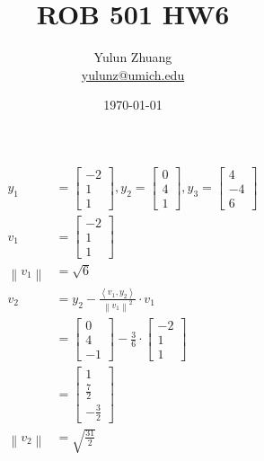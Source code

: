 \documentclass{article}
\title{ROB 501 HW6}
\author{Yulun Zhuang \\ \href{mailto:yulunz@umich.edu}{yulunz@umich.edu}}
\date{\today}
\theoremstyle{definition} %
\begin{document}
\maketitle

\section{}
\begin{align*}
    y_1 &=\left[\begin{array}{c}
    -2 \\
    1 \\
    1
    \end{array}\right], y_2=\left[\begin{array}{l}
    0 \\
    4 \\
    1
    \end{array}\right], y_3=\left[\begin{array}{c}
    4 \\
    -4 \\
    6
    \end{array}\right] \\
    v_1 &=\left[\begin{array}{c}
    -2 \\
    1 \\
    1
    \end{array}\right]\\
    \left\|v_1\right\| &= \sqrt{6} \\
    v_2 &=y_2-\frac{\left\langle v_1, y_2\right\rangle}{\left\|v_1\right\|^2} \cdot v_1 \\
    &=\left[\begin{array}{c}
    0 \\
    4 \\
    -1
    \end{array}\right]-\frac{3}{6} \cdot\left[\begin{array}{r}
    -2 \\
    1 \\
    1
    \end{array}\right] \\
    &=\left[\begin{array}{c}
    1 \\
    \frac{7}{2} \\
    -\frac{3}{2}
    \end{array}\right] \\
    \left\|v_2\right\| &=\sqrt{\frac{31}{2}}\\

\end{align*}
\end{document}
